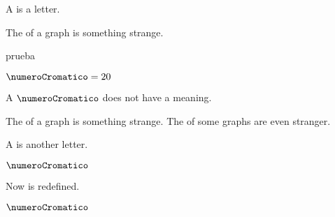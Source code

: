 \documentclass{article}
\begin{document}
A  is a letter.

The  of a graph is something strange.


\begin{section}{prueba}
    
    $\numeroCromatico = 20$

    A $\numeroCromatico$ does not have a meaning.

    The \thinness of a graph is something strange.
    The \thinnesses of some graphs are even stranger.
\end{section}


A  is another letter.
\vspace{10cm}

$\numeroCromatico$

Now  is redefined.

$\numeroCromatico$
\end{document}
